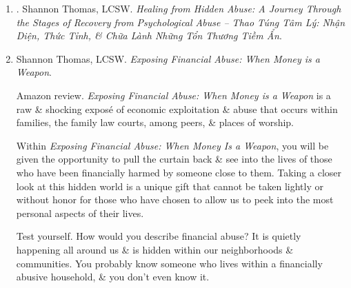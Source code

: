 \documentclass{article}
\begin{document}
\begin{enumerate}
	Bridging clinical advice with pop culture language, {\sc Thomas} approaches her counseling work \& writing from the lens of a therapist \& as a fellow survivor of psychological abuse. Her 1st book, {\it Healing from Hidden Abuse}, is an international bestseller, has been published in multiple languages, \& serves as a road map for book studies \& host groups in 11 countries \& 35 states across the United States. {\sc Thomas} also coined the ``6 Stages of Healing from Hidden Abuse'' model, which has been met with favorable reviews \& high applause from readers \& medical professionals across the world.

	{\sc Thomas} has been featured in top media outlets including The Oprah Magazine, Associated Press, Business Insider, Reader's Digest, Yahoo!, Yahoo! Finance, Teen Vogue, Elite Daily, \& Bustle.

	\item \cite{Thomas_psychological_manipulation_VN}. {\sc Shannon Thomas, LCSW}. {\it Healing from Hidden Abuse: A Journey Through the Stages of Recovery from Psychological Abuse -- Thao Túng Tâm Lý: Nhận Diện, Thức Tỉnh, \& Chữa Lành Những Tổn Thương Tiềm Ẩn}.\hfill{\sf[done]}

	\item {\sc Shannon Thomas, LCSW}. {\it Exposing Financial Abuse: When Money is a Weapon}. {}

	{\sf Amazon review.} {\it Exposing Financial Abuse: When Money is a Weapon} is a raw \& shocking expos\'e of economic exploitation \& abuse that occurs within families, the family law courts, among peers, \& places of worship.

	Within {\it Exposing Financial Abuse: When Money Is a Weapon}, you will be given the opportunity to pull the curtain back \& see into the lives of those who have been financially harmed by someone close to them. Taking a closer look at this hidden world is a unique gift that cannot be taken lightly or without honor for those who have chosen to allow us to peek into the most personal aspects of their lives.

	Test yourself. How would you describe financial abuse? It is quietly happening all around us \& is hidden within our neighborhoods \& communities. You probably know someone who lives within a financially abusive household, \& you don't even know it.


\end{enumerate}
\end{document}
